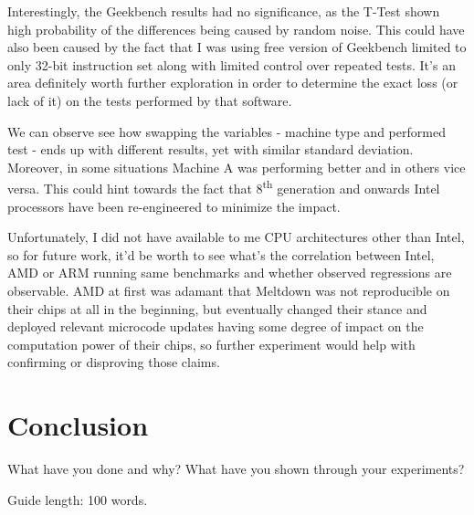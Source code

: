 \documentclass{csfourzero}
\begin{document}
Interestingly, the Geekbench results had no significance, as the T-Test shown high probability of the differences being caused by random noise. This could have also been caused by the fact that I was using free version of Geekbench limited to only 32-bit instruction set along with limited control over repeated tests. It's an area definitely worth further exploration in order to determine the exact loss (or lack of it) on the tests performed by that software.  

We can observe see how swapping the variables - machine type and performed test - ends up with different results, yet with similar standard deviation. Moreover, in some situations Machine A was performing better and in others vice versa. This could hint towards the fact that 8\textsuperscript{th} generation and onwards Intel processors have been re-engineered to minimize the impact.  

Unfortunately, I did not have available to me CPU architectures other than Intel, so for future work, it'd be worth to see what's the correlation between Intel, AMD or ARM running same benchmarks and whether observed regressions are observable. AMD at first was adamant that Meltdown was not reproducible on their chips at all in the beginning, but eventually changed their stance \cite{amdsec} and deployed relevant microcode updates having some degree of impact on the computation power of their chips, so further experiment would help with confirming or disproving those claims. 

\section{Conclusion}
\label{sec:conc}

What have you done and why? What have you shown through your
experiments?

Guide length: 100 words.


\end{document}
